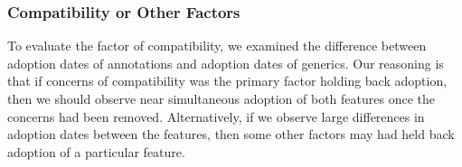\documentclass{svjour3}
\newcommand{\squirrelsql}{\textsc{Squirrel-SQL}\xspace}
\newcommand{\eclipsecs}{\textsc{Eclipse-cs}\xspace}
\newcommand{\azureus}{\textsc{Azureus}\xspace}
\newcommand{\jedit}{\textsc{JEdit}\xspace}
\newcommand{\spring}{the \textsc{Spring Framework}\xspace}
\newcommand{\junit}{\textsc{JUnit}\xspace}
\newcommand{\maven}{\textsc{Maven}\xspace}
\newcommand{\lucene}{\textsc{Lucene}\xspace}
\newcommand{\jdt}{\textsc{JDT}\xspace}
\newcommand{\hibernate}{\textsc{Hibernate}\xspace}
\newcommand{\commons}{\textsc{Commons Collections}\xspace}
\newcommand{\weka}{\textsc{Weka}\xspace}
\newcommand{\findbugs}{\textsc{FindBugs}\xspace}
\newcommand{\checkstyle}{\textsc{CheckStyle}\xspace}
\newcommand{\logfourj}{\textsc{Log4j}\xspace}
\newcommand{\xerces}{\textsc{Xerces}\xspace}
\newcommand{\ant}{\textsc{Ant}\xspace}
\newcommand{\freemind}{\textsc{FreeMind}\xspace}
\newcommand{\jetty}{\textsc{Jetty}\xspace}
\newcommand{\subclipse}{\textsc{Subclipse}\xspace}
\begin{document}


\subsubsection{Compatibility or Other Factors}

To evaluate the factor of compatibility, 
we examined the difference between adoption dates of annotations and adoption dates of generics. Our reasoning is that if concerns of compatibility was the primary factor holding back adoption,
then we should observe near simultaneous adoption of both features once the concerns had been removed.  Alternatively, if we observe large differences in adoption dates between the features, 
then some other factors may had held back adoption of a particular feature.
\end{document}
